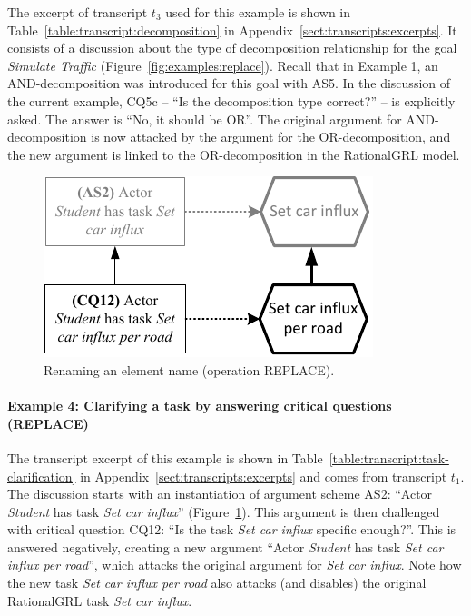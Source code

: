 The excerpt of transcript $t_3$ used for this example is shown in Table~\ref{table:transcript:decomposition} in Appendix~\ref{sect:transcripts:excerpts}. It consists of a discussion about the type of decomposition relationship for the goal \emph{Simulate Traffic} (Figure~\ref{fig:examples:replace}). Recall that in Example 1, an AND-decomposition was introduced for this goal with AS5. In the discussion of the current example, CQ5c -- ``Is the decomposition type correct?'' -- is explicitly asked. The answer is ``No, it should be OR''. The original argument for AND-decomposition is now attacked  by the argument for the OR-decomposition, and the new argument is linked to the OR-decomposition in the RationalGRL model. 


\begin{figure}[b]
\centering
\includegraphics[]{img/fig_example_rename.pdf}
\caption{Renaming an element name (operation \textsf{REPLACE)}.}
\label{fig:examples:clarification}
\end{figure}

\paragraph{Example 4: Clarifying a task by answering critical questions (\textsf{REPLACE})}

The transcript excerpt of this example is shown in Table~\ref{table:transcript:task-clarification} in Appendix~\ref{sect:transcripts:excerpts} and comes from transcript $t_1$. The discussion starts with an instantiation of argument scheme AS2: ``Actor \emph{Student} has task \emph{Set car influx}'' (Figure~\ref{fig:examples:clarification}). This argument is then challenged with critical question CQ12: ``Is the task \emph{Set car influx} specific enough?''. This is answered negatively, creating a new argument ``Actor \emph{Student} has task \emph{Set car influx per road}'', which attacks the original argument for \emph{Set car influx}. Note how the new task \emph{Set car influx per road} also attacks (and disables) the original RationalGRL task \emph{Set car influx}. 



